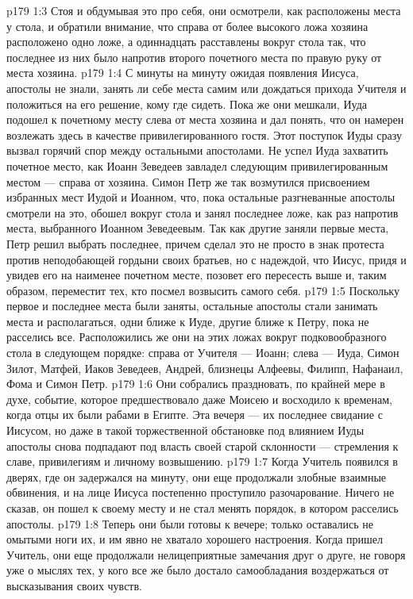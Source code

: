 \vs p179 1:3 Стоя и обдумывая это про себя, они осмотрели, как расположены места у стола, и обратили внимание, что справа от более высокого ложа хозяина расположено одно ложе, а одиннадцать расставлены вокруг стола так, что последнее из них было напротив второго почетного места по правую руку от места хозяина.
\vs p179 1:4 С минуты на минуту ожидая появления Иисуса, апостолы не знали, занять ли себе места самим или дождаться прихода Учителя и положиться на его решение, кому где сидеть. Пока же они мешкали, Иуда подошел к почетному месту слева от места хозяина и дал понять, что он намерен возлежать здесь в качестве привилегированного гостя. Этот поступок Иуды сразу вызвал горячий спор между остальными апостолами. Не успел Иуда захватить почетное место, как Иоанн Зеведеев завладел следующим привилегированным местом --- справа от хозяина. Симон Петр же так возмутился присвоением избранных мест Иудой и Иоанном, что, пока остальные разгневанные апостолы смотрели на это, обошел вокруг стола и занял последнее ложе, как раз напротив места, выбранного Иоанном Зеведеевым. Так как другие заняли первые места, Петр решил выбрать последнее, причем сделал это не просто в знак протеста против неподобающей гордыни своих братьев, но с надеждой, что Иисус, придя и увидев его на наименее почетном месте, позовет его пересесть выше и, таким образом, переместит тех, кто посмел возвысить самого себя.
\vs p179 1:5 Поскольку первое и последнее места были заняты, остальные апостолы стали занимать места и располагаться, одни ближе к Иуде, другие ближе к Петру, пока не расселись все. Расположились же они на этих ложах вокруг подковообразного стола в следующем порядке: справа от Учителя --- Иоанн; слева --- Иуда, Симон Зилот, Матфей, Иаков Зеведеев, Андрей, близнецы Алфеевы, Филипп, Нафанаил, Фома и Симон Петр.
\vs p179 1:6 \pc Они собрались праздновать, по крайней мере в духе, событие, которое предшествовало даже Моисею и восходило к временам, когда отцы их были рабами в Египте. Эта вечеря --- их последнее свидание с Иисусом, но даже в такой торжественной обстановке под влиянием Иуды апостолы снова подпадают под власть своей старой склонности --- стремления к славе, привилегиям и личному возвышению.
\vs p179 1:7 \pc Когда Учитель появился в дверях, где он задержался на минуту, они еще продолжали злобные взаимные обвинения, и на лице Иисуса постепенно проступило разочарование. Ничего не сказав, он пошел к своему месту и не стал менять порядок, в котором расселись апостолы.
\vs p179 1:8 Теперь они были готовы к вечере; только оставались не омытыми ноги их, и им явно не хватало хорошего настроения. Когда пришел Учитель, они еще продолжали нелицеприятные замечания друг о друге, не говоря уже о мыслях тех, у кого все же было достало самообладания воздержаться от высказывания своих чувств.
